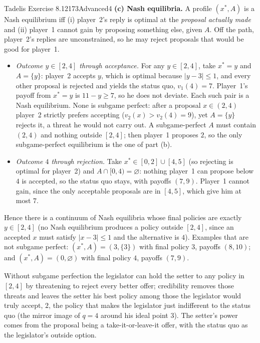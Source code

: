 \begin{exsol}{Tadelis Exercise 8.12}{173}{Advanced}{4}
\textbf{(c) Nash equilibria.} A profile $(x^*, A)$ is a Nash equilibrium iff (i) player~2's reply is optimal at the
\emph{proposal actually made} and (ii) player~1 cannot gain by proposing something else, given $A$. Off the path,
player~2's replies are unconstrained, so he may reject proposals that would be good for player~1.
\begin{itemize}
  \item \emph{Outcome $y \in [2,4]$ through acceptance.} For any $y \in [2,4]$, take $x^* = y$ and $A = \{y\}$:
  player~2 accepts $y$, which is optimal because $|y-3| \le 1$, and every other proposal is rejected and yields the
  status quo, $v_1(4) = 7$. Player~1's payoff from $x^* = y$ is $11 - y \ge 7$, so he does not deviate. Each
  such pair is a Nash equilibrium. None is subgame perfect: after a proposal $x \in (2,4)$ player~2 strictly
  prefers accepting ($v_2(x) > v_2(4) = 9$), yet $A = \{y\}$ rejects it, a threat he would not carry out. A
  subgame-perfect $A$ must contain $(2,4)$ and nothing outside $[2,4]$; then player~1 proposes $2$, so the only
  subgame-perfect equilibrium is the one of part (b).
  \item \emph{Outcome $4$ through rejection.} Take $x^* \in [0,2] \cup [4,5]$ (so rejecting is optimal for
  player~2) and $A \cap [0,4) = \varnothing$: nothing player~1 can propose below $4$ is accepted, so the status quo
  stays, with payoffs $(7, 9)$. Player~1 cannot gain, since the only acceptable proposals are in $[4,5]$, which
  give him at most $7$.
\end{itemize}
Hence there is a continuum of Nash equilibria whose final policies are exactly $y \in [2,4]$ (no Nash
equilibrium produces a policy outside $[2,4]$, since an accepted $x$ must satisfy $|x-3| \le 1$ and the
alternative is $4$). Examples that are not subgame perfect: $(x^*, A) = (3, \{3\})$ with final policy $3$, payoffs
$(8, 10)$; and $(x^*, A) = (0, \varnothing)$ with final policy $4$, payoffs $(7, 9)$.

\interp Without subgame perfection the legislator can hold the setter to any policy in $[2,4]$ by threatening
to reject every better offer; credibility removes those threats and leaves the setter his best policy among those the
legislator would truly accept, $2$, the policy that makes the legislator just indifferent to the status quo
(the mirror image of $q = 4$ around his ideal point $3$). The setter's power comes from the proposal being a
take-it-or-leave-it offer, with the status quo as the legislator's outside option.


\end{exsol}
